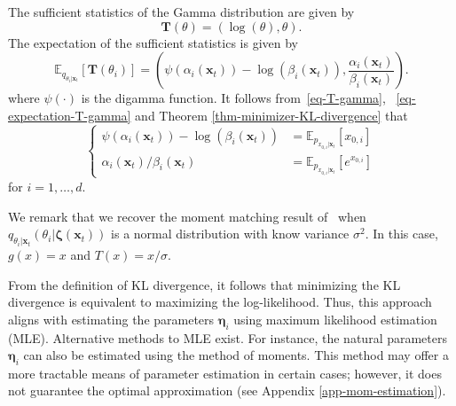 \begin{example}
The sufficient statistics of the Gamma distribution are given by
\begin{equation}\label{eq-T-gamma}
\mathbf{T}(\theta) =  (\log(\theta), \theta)  .
\end{equation}
The expectation of the sufficient statistics is given by
\begin{equation}\label{eq-expectation-T-gamma}
     \mathbb{E}_{q_{\theta_i\vert \mathbf{x}_t}}[\mathbf{T}(\theta_i)] = \left(\psi(\alpha_i(\mathbf{x}_t)) - \log(\beta_i(\mathbf{x}_t)),  \frac{\alpha_i(\mathbf{x}_t)}{\beta_i(\mathbf{x}_t)}\right).
\end{equation}
where $\psi(\cdot)$ is the digamma function. 
It follows from~\eqref{eq-T-gamma}, ~\eqref{eq-expectation-T-gamma} and Theorem \ref{thm-minimizer-KL-divergence} that
\begin{equation}
\label{eq-system-gamma}
\begin{cases}
     \psi(\alpha_i(\mathbf{x}_t)) - \log(\beta_i(\mathbf{x}_t))  &= \mathbb{E}_{p_{{x}_{0,i}\vert \mathbf{x}_t}}[x_{0,i}] \\
    \alpha_i(\mathbf{x}_t)/\beta_i(\mathbf{x}_t) &=  \mathbb{E}_{p_{{x}_{0,i}\vert \mathbf{x}_t}}[e^{x_{0,i}}]
\end{cases}
\end{equation}
for $i=1,\ldots,d$.
\end{example}
\begin{remark}
    We remark that we recover the moment matching result of~\cite{boys2024} when $q_{\theta_i\vert \mathbf{x}_t}(\theta_i\vert \boldsymbol{\zeta}(\mathbf{x}_{t}))$ is a normal distribution with know variance $\sigma^{2}$. In this case, $g(x)=x$ and $T(x)= x/\sigma$. 
\end{remark}

\begin{remark} \label{remark-MLE_estimation}
    From the definition of KL divergence, it follows that minimizing the KL divergence is equivalent to maximizing the log-likelihood. Thus, this approach aligns with estimating the parameters $\boldsymbol{\eta}_{i}$ using maximum likelihood estimation (MLE).
    Alternative methods to MLE exist. For instance, the natural parameters $\boldsymbol{\eta}_{i}$ can also be estimated using the method of moments. This method may offer a more tractable means of parameter estimation in certain cases; however, it does not guarantee the optimal approximation (see Appendix \ref{app-mom-estimation}). 
\end{remark}

